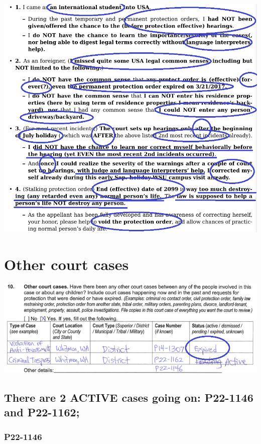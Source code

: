 \documentclass[9pt, b5paper]{article}
\begin{document}
\includegraphics[width=.9\linewidth]{./pic/dearCousin_20220920_093957.png}

\section{Other court cases}
\label{sec-2}

\includegraphics[width=.9\linewidth]{./pic/dearCousin_20220919_153339.png}
\subsection{There are 2 ACTIVE cases going on: \textbf{P22-1146} and \textbf{P22-1162};}
\label{sec-2-1}
\subsubsection{\textbf{P22-1146}}
\label{sec-2-1-1}
\end{document}
